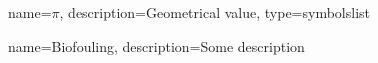 
 {
    name=$\pi$,
    description={Geometrical value},
    type=symbolslist
}


\newcommand{\acroX}[2]{\newacronym{#1}{#1}{#2}}

\newcommand{\acroY}[3]{\newacronym{#1}{#2}{#3}}


 {
    name=Biofouling,
    description={Some description}
}
